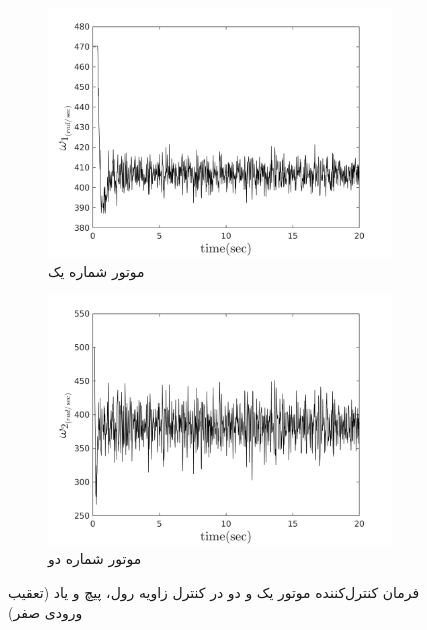 \begin{figure}
	[width=12cm]
	\centering
	\begin{subfigure}
		\centering
		\includegraphics[width=12cm]{../Figures/MIL/LQIDG/Roll_Pitch/lqidg_roll_pitch_Omega_1.png}
		\caption{موتور شماره یک}
	\end{subfigure}
	\begin{subfigure}
		\centering
		\includegraphics[width=12cm]{../Figures/MIL/LQIDG/Roll_Pitch/lqidg_roll_pitch_Omega_2.png}
		\caption{موتور شماره دو}
	\end{subfigure}
	\caption{‫‪فرمان کنترل‌کننده موتور یک و دو در کنترل زاویه  رول، پیچ و یاد (تعقیب ورودی صفر)}
\end{figure}


